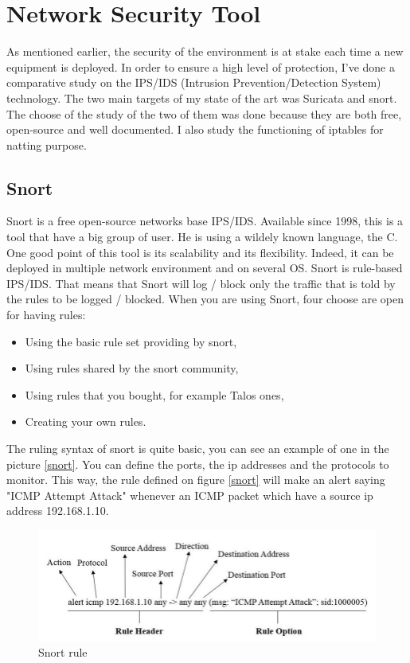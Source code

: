 \documentclass{tnreport}
\begin{document}
\section{Network Security Tool}
As mentioned earlier, the security of the environment is at stake each time a new equipment is deployed. In order to ensure a high level of protection, I've done a comparative study on the \gls{IPS}/\gls{IDS}  (Intrusion Prevention/Detection System) technology. The two main targets of my state of the art was Suricata and snort. The choose of the study of the two of them was done because they are both free, open-source and well documented. I also study the functioning of iptables for natting purpose.

\subsection{Snort}
Snort is a free open-source networks base \gls{IPS}/\gls{IDS}. Available since 1998, this is a tool that have a big group of user. He is using a wildely known language, the C. One good point of this tool is its scalability and its flexibility. Indeed, it can be deployed in multiple network environment and on several OS. Snort is rule-based \gls{IPS}/\gls{IDS}. That means that Snort will log / block only the traffic that is told by the rules to be logged / blocked. When you are using Snort, four choose are open for having rules: 
\begin{itemize}
    \item Using the basic rule set providing by snort,
    \item Using rules shared by the snort community,
    \item Using rules that you bought, for example Talos ones,
    \item Creating your own rules.
\end{itemize}
The ruling syntax of snort is quite basic, you can see an example of one in the picture \ref{snort}. You can define the ports, the ip addresses and the protocols to monitor. This way, the rule defined on figure \ref{snort} will make an alert saying "ICMP Attempt Attack" whenever an ICMP packet which have a source ip address 192.168.1.10. 
\begin{figure}[h!]
  \begin{center}
  \includegraphics[scale=0.7]{figures/snort_rules}
  \caption{Snort rule \cite{lib22}}
  \label{snort_rules}
  \end{center}
\end{figure}
\end{document}
